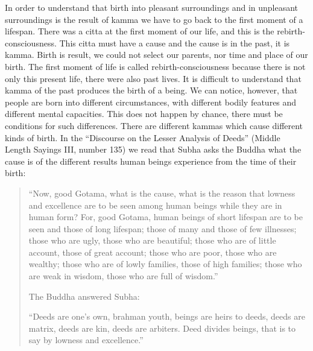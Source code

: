 \documentclass{book}
\begin{document}
In order to understand that birth into pleasant surround­ings and in
unpleasant surroundings is the result of kamma we have to go back to the
first moment of a lifespan. There was a citta at the first moment of our
life, and this is the rebirth-consciousness. This citta must have a
cause and the cause is in the past, it is kamma. Birth is result, we
could not select our parents, nor time and place of our birth. The first
moment of life is called rebirth-consciousness because there is not only
this present life, there were also past lives. It is difficult to
understand that kamma of the past produces the birth of a being. We can
notice, however, that people are born into different circum­stances,
with different bodily features and different mental capacities. This
does not happen by chance, there must be conditions for such
differences. There are different kam­mas which cause different kinds of
birth. In the ``Discourse on the Lesser Analysis of Deeds'' (Middle
Length Sayings III, number 135) we read that Subha asks the Buddha what
the cause is of the different results human beings experience from the
time of their birth:

\begin{quote}
``Now, good Gotama, what is the cause, what is the reason that lowness
and excellence are to be seen among human beings while they are in human
form? For, good Gotama, human beings of short lifespan are to be seen
and those of long lifespan; those of many and those of few illnesses;
those who are ugly, those who are beautiful; those who are of little
account, those of great account; those who are poor, those who are
wealthy; those who are of lowly families, those of high families; those
who are weak in wisdom, those who are full of wisdom.''

The Buddha answered Subha:

``Deeds are one's own, brahman youth, beings are heirs to deeds, deeds
are matrix, deeds are kin, deeds are arbiters. Deed divides beings, that
is to say by lowness and excellence.''
\end{quote}
\end{document}
